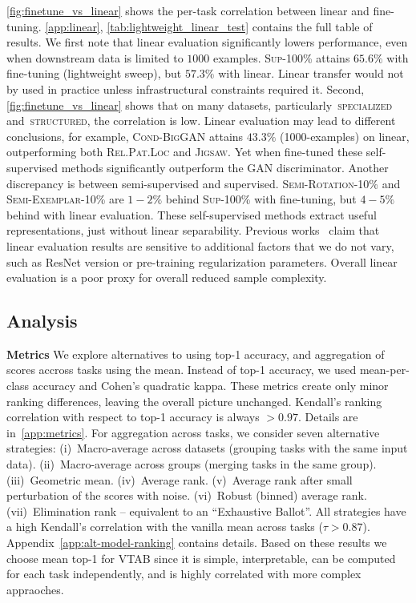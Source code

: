 \documentclass{article}
\newcommand{\myparagraph}[1]{\noindent\textbf{#1}\quad}
\DeclareRobustCommand{\taskSpecialized}{\raisebox{0.5pt}{\tikz{\fill[specialized] (0,0) circle (.5ex);}}\,\textsc{specialized}}
\DeclareRobustCommand{\taskStructured}{\raisebox{0.5pt}{\tikz{\fill[structured] (0,0) circle (.5ex);}}\,\textsc{structured}}
\begin{document}
\cref{fig:finetune_vs_linear} shows the per-task correlation between linear and fine-tuning.
\cref{app:linear}, \cref{tab:lightweight_linear_test} contains the full table of results.
We first note that linear evaluation significantly lowers performance, even when downstream data is limited to $1000$ examples.
\textsc{Sup-100\%} attains $65.6\%$ with fine-tuning (lightweight sweep), but $57.3\%$ with linear.
Linear transfer would not by used in practice unless infrastructural constraints required it.
Second, \cref{fig:finetune_vs_linear} shows that on many datasets, particularly \taskSpecialized{} and \taskStructured{}, the correlation is low.
Linear evaluation may lead to different conclusions, for example, \textsc{Cond-BigGAN} attains $43.3\%$ (1000-examples) on linear, outperforming both \textsc{Rel.Pat.Loc} and \textsc{Jigsaw}.
Yet when fine-tuned these self-supervised methods significantly outperform the GAN discriminator.
Another discrepancy is between semi-supervised and supervised.
\textsc{Semi-Rotation-10\%} and \textsc{Semi-Exemplar-10\%} are $1-2\%$ behind \textsc{Sup-100\%} with fine-tuning, but $4-5\%$ behind with linear evaluation.
These self-supervised methods extract useful representations, just without linear separability.
Previous works~\citep{kornblith2018better,kolesnikov2019revisiting} claim that linear evaluation results are sensitive to additional factors that we do not vary, such as ResNet version or pre-training regularization parameters.
Overall linear evaluation is a poor proxy for overall reduced sample complexity.


\subsection{Analysis\label{sec:analysis}}

\myparagraph{Metrics}
We explore alternatives to using top-1 accuracy, and aggregation of scores accross tasks using the mean.
Instead of top-1 accuracy, we used mean-per-class accuracy and Cohen's quadratic kappa.
These metrics create only minor ranking differences, leaving the overall picture unchanged.
Kendall's ranking correlation with respect to top-1 accuracy is always $>0.97$.
Details are in~\ref{app:metrics}.
For aggregation across tasks, we consider seven alternative strategies:
(i)~Macro-average across datasets (grouping tasks with the same input data).
(ii)~Macro-average across groups (merging tasks in the same group).
(iii)~Geometric mean.
(iv)~Average rank.
(v)~Average rank after small perturbation of the scores with noise.
(vi)~Robust (binned) average rank.
(vii)~Elimination rank -- equivalent to an ``Exhaustive Ballot''.
All strategies have a high Kendall's correlation with the vanilla mean across tasks ($\tau>0.87$).
Appendix~\ref{app:alt-model-ranking} contains details.
Based on these results we choose mean top-1 for VTAB since it is simple, interpretable, can be computed for each task independently, and is highly correlated with more complex appraoches.
\end{document}

